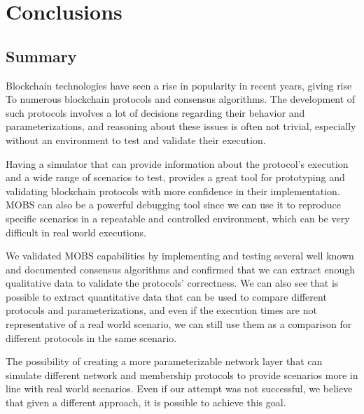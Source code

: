 
%

\chapter{Conclusions}\label{cha:conclusions}


\section{Summary}\label{sub:summary}

Blockchain technologies have seen a rise in popularity in recent years, giving rise To
numerous blockchain protocols and consensus algorithms. The development of
such protocols involves a lot of decisions regarding their behavior and parameterizations,
and reasoning about these issues is often not trivial, especially without an environment to
test and validate their execution.

Having a simulator that can provide information about the protocol's execution and a wide
range of scenarios to test, provides a great tool for prototyping and validating
blockchain protocols with more confidence in their implementation. MOBS can also
be a powerful debugging tool since we can use it to reproduce specific scenarios in a
repeatable and controlled environment, which can be very difficult in real world executions.

We validated MOBS capabilities by implementing and testing several well known
and documented consensus algorithms and confirmed that we can extract enough
qualitative data to validate the protocols' correctness. We can also see that is possible
to extract quantitative data that can be used to compare different protocols and
parameterizations, and even if the execution times are not representative of a real
world scenario, we can still use them as a comparison for different protocols in
the same scenario.

The possibility of creating a more parameterizable network layer that can
simulate different network and membership protocols to provide scenarios more in line
with real world scenarios. Even if our attempt was not successful, we believe that
given a different approach, it is possible to achieve this goal.


